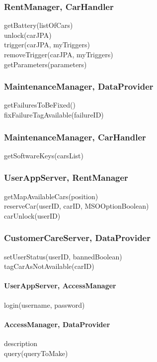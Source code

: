 \subsubsection{RentManager, CarHandler}
getBattery(listOfCars) \\
unlock(carJPA) \\
trigger(carJPA, myTriggers) \\
removeTrigger(carJPA, myTriggers) \\
getParameters(parameters) \\ %

\subsubsection{MaintenanceManager, DataProvider}
getFailuresToBeFixed()\\
fixFailureTagAvailable(failureID)

\subsubsection{MaintenanceManager, CarHandler}
getSoftwareKeys(carsList) 

\subsubsection{UserAppServer, RentManager}
getMapAvailableCars(position) \\
reserveCar(userID, carID, MSOOptionBoolean) \\
carUnlock(userID) \\

\subsubsection{CustomerCareServer, DataProvider}
setUserStatus(userID, bannedBoolean) \\
tagCarAsNotAvailable(carID) \\


\paragraph{UserAppServer, AccessManager}
login(username, password) %

\paragraph{AccessManager, DataProvider} 
description \\
query(queryToMake)

